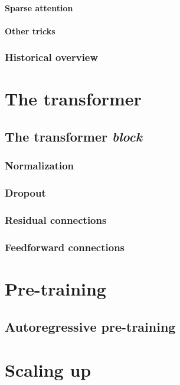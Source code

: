 \documentclass{pca}
\theoremstyle{theorem}
\theoremstyle{definition}
\theoremstyle{proof}
\begin{document}
\subsubsection{Sparse attention}

\subsubsection{Other tricks}

\subsection{Historical overview}

\chapter{The transformer}

\section{The transformer \emph{block}}

\subsection{Normalization}
\subsection{Dropout}
\subsection{Residual connections}


\subsection{Feedforward connections}

\chapter{Pre-training}

\section{Autoregressive pre-training}

\chapter{Scaling up}
\end{document}
